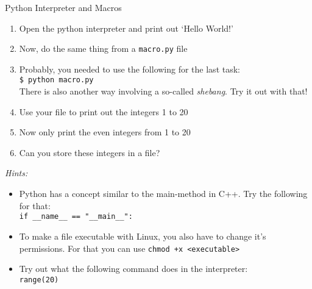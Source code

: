\documentclass[10pt, aspectratio=169]{beamer}
\begin{document}
\begin{frame}{Python Interpreter and Macros}
  \begin{enumerate}
  \item
    Open the python interpreter and print out `Hello World!'
  \item
    Now, do the same thing from a \texttt{macro.py} file
  \item
    Probably, you needed to use the following for the last task: \\
    \quad \texttt{\$  python macro.py} \\
    There is also another way involving a so-called \emph{shebang}. Try it out with that!
  \item
    Use your file to print out the integers 1 to 20
  \item
    Now only print the even integers from 1 to 20
  \item
    Can you store these integers in a file?
  \end{enumerate}

  \textit{Hints:}
  \begin{itemize}
  \item
    Python has a concept similar to the main-method in C++. Try the following for that: \\
    \quad \texttt{if \_\_name\_\_ == "\_\_main\_\_":}
  \item
    To make a file executable with Linux, you also have to change it's permissions. For that you can use \texttt{chmod +x <executable>}
  \item
    Try out what the following command does in the interpreter: \\
    \quad \texttt{range(20)}
  \end{itemize}
\end{frame}
\end{document}

